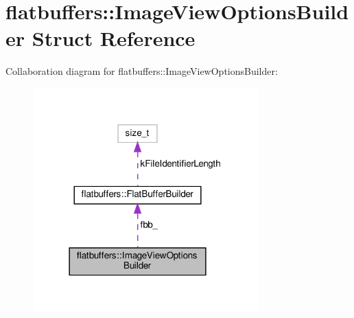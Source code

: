 \hypertarget{structflatbuffers_1_1ImageViewOptionsBuilder}{}\section{flatbuffers\+:\+:Image\+View\+Options\+Builder Struct Reference}
\label{structflatbuffers_1_1ImageViewOptionsBuilder}


Collaboration diagram for flatbuffers\+:\+:Image\+View\+Options\+Builder\+:
\nopagebreak
\begin{figure}[H]
\begin{center}
\leavevmode
\includegraphics[width=246pt]{structflatbuffers_1_1ImageViewOptionsBuilder__coll__graph}
\end{center}
\end{figure}
